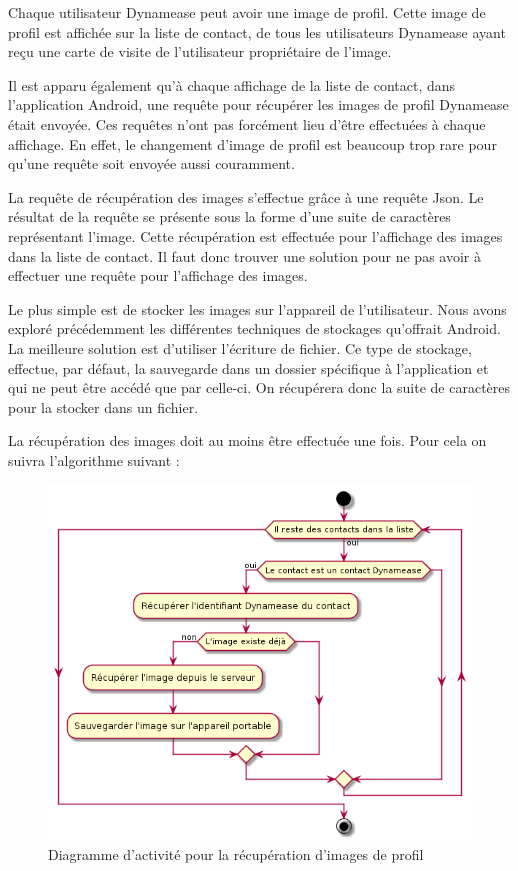 Chaque utilisateur Dynamease peut avoir une image de profil. Cette image de profil est affichée sur la liste de contact, de tous les utilisateurs Dynamease ayant reçu une carte de visite de l'utilisateur propriétaire de l'image.

Il est apparu également qu'à chaque affichage de la liste de contact, dans l'application Android, une requête pour récupérer les images de profil Dynamease était envoyée. Ces requêtes n'ont pas forcément lieu d'être effectuées à chaque affichage. En effet, le changement d'image de profil est beaucoup trop rare pour qu'une requête soit envoyée aussi couramment.

La requête de récupération des images s'effectue grâce à une requête Json. Le résultat de la requête se présente sous la forme d'une suite de caractères représentant l'image. Cette récupération est effectuée pour l'affichage des images dans la liste de contact. Il faut donc trouver une solution pour ne pas avoir à effectuer une requête pour l'affichage des images.

Le plus simple est de stocker les images sur l'appareil de l'utilisateur. Nous avons exploré précédemment les différentes techniques de stockages qu'offrait Android. La meilleure solution est d'utiliser l'écriture de fichier. Ce type de stockage, effectue, par défaut, la sauvegarde dans un dossier spécifique à l'application et qui ne peut être accédé que par celle-ci. On récupérera donc la suite de caractères pour la stocker dans un fichier.

La récupération des images doit au moins être effectuée une fois. Pour cela on suivra l'algorithme suivant :

\begin{figure}[!h]
	\centering
	\includegraphics[scale=0.5]{img/activity_image.png}
	\caption{\label{activity_image} {Diagramme d'activité pour la récupération d'images de profil}}
\end{figure}

